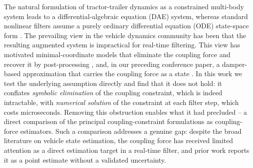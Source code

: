\documentclass[conference]{IEEEtran}
\begin{document}
The natural formulation of tractor-trailer dynamics as a constrained multi-body system leads to a differential-algebraic equation (DAE) system, whereas standard nonlinear filters assume a purely ordinary differential equation (ODE) state-space form \cite{becerra_applying_2001}. The prevailing view in the vehicle dynamics community has been that the resulting augmented system is impractical for real-time filtering. This view has motivated minimal-coordinate models that eliminate the coupling force and recover it by post-processing \cite{ghandriz_computationally_2020}, and, in our preceding conference paper, a damper-based approximation that carries the coupling force as a state \cite{ceder_bayesian_2025}. In this work we test the underlying assumption directly and find that it does not hold: it conflates \emph{symbolic elimination} of the coupling constraint, which is indeed intractable, with \emph{numerical solution} of the constraint at each filter step, which costs microseconds. Removing this obstruction enables what it had precluded -- a direct comparison of the principal coupling-constraint formulations as coupling-force estimators. Such a comparison addresses a genuine gap: despite the broad literature on vehicle state estimation, the coupling force has received limited attention as a direct estimation target in a real-time filter, and prior work reports it as a point estimate without a validated uncertainty.
\end{document}

